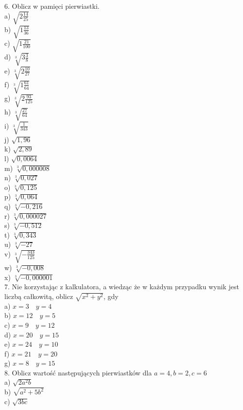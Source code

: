 \documentclass[10pt]{article}
\begin{document}
6. Oblicz w pamięci pierwiastki.\\
a) \(\sqrt{2 \frac{14}{25}}\)\\
b) \(\sqrt{1 \frac{13}{36}}\)\\
c) \(\sqrt{1 \frac{21}{100}}\)\\
d) \(\sqrt[3]{3 \frac{3}{8}}\)\\
e) \(\sqrt[3]{2 \frac{10}{27}}\)\\
f) \(\sqrt[3]{1 \frac{61}{64}}\)\\
g) \(\sqrt[3]{2 \frac{93}{125}}\)\\
h) \(\sqrt[3]{\frac{27}{64}}\)\\
i) \(\sqrt[3]{\frac{1}{343}}\)\\
j) \(\sqrt{1,96}\)\\
k) \(\sqrt{2,89}\)\\
l) \(\sqrt{0,0064}\)\\
m) \(\sqrt[3]{0,000008}\)\\
n) \(\sqrt[3]{0,027}\)\\
o) \(\sqrt[3]{0,125}\)\\
p) \(\sqrt[3]{0,064}\)\\
q) \(\sqrt[3]{-0,216}\)\\
r) \(\sqrt[3]{0,000027}\)\\
s) \(\sqrt[3]{-0,512}\)\\
t) \(\sqrt[3]{0,343}\)\\
u) \(\sqrt[3]{-27}\)\\
v) \(\sqrt[3]{-\frac{343}{125}}\)\\
w) \(\sqrt[3]{-0,008}\)\\
x) \(\sqrt[3]{-0,000001}\)\\
7. Nie korzystając z kalkulatora, a wiedząc że w każdym przypadku wynik jest liczbą całkowitą, oblicz \(\sqrt{x^{2}+y^{2}}\), gdy\\
a) \(x=3 \quad y=4\)\\
b) \(x=12 \quad y=5\)\\
c) \(x=9 \quad y=12\)\\
d) \(x=20 \quad y=15\)\\
e) \(x=24 \quad y=10\)\\
f) \(x=21 \quad y=20\)\\
g) \(x=8 \quad y=15\)\\
8. Oblicz wartość następujących pierwiastków dla \(a=4, b=2, c=6\)\\
a) \(\sqrt{2 a^{2} b}\)\\
b) \(\sqrt{a^{2}+5 b^{2}}\)\\
c) \(\sqrt{3 b c}\)\\
\end{document}
